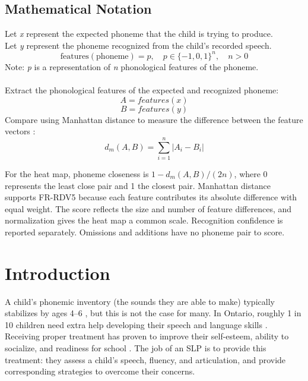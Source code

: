 \documentclass[12pt]{article}
\begin{document}
\subsection{Mathematical Notation} \label{sec:phoneme-notation}

Let \textit{x} represent the expected phoneme that the child is trying to produce.\\
Let \textit{y} represent the phoneme recognized from the child's recorded speech.\\
  \begin{equation}
    \mathrm{features}(\mathrm{phoneme}) = p,\quad p \in \{-1,0,1\}^n,\quad n>0
  \end{equation}
\noindent Note: \textit{p} is a representation of \textit{n} phonological features of the phoneme.\\ \\
\noindent Extract the phonological features of the expected and recognized phoneme:
\begin{equation}
  A = features(x)
\end{equation}
\begin{equation}
  B = features(y)
\end{equation}
\noindent Compare using Manhattan distance to measure the difference between the feature vectors \cite{manhattan_distance_sd}:
\begin{equation}
  d_m(A,B) = \sum_{i=1}^{n} |A_i - B_i|
\end{equation}

For the heat map, phoneme closeness is $1 - d_m(A,B)/(2n)$, where
0 represents the least close pair and 1 the closest pair. Manhattan distance
supports FR-RDV5 because each feature contributes its absolute difference
with equal weight. The score reflects the size and number of feature
differences, and normalization gives the heat map a common scale. Recognition
confidence is reported separately. Omissions and additions have no phoneme
pair to score.
\newpage


\section{Introduction} \label{sec:introduction}

A child’s phonemic inventory (the sounds they are able to make) typically stabilizes by ages 4--6 \cite{kid_sense_dev}, but this is not the case for many. In Ontario, roughly 1 in 10 children need extra help developing their speech and language skills \cite{ontario_slp_facts}. Receiving proper treatment has proven to improve their self-esteem, ability to socialize, and readiness for school \cite{ontario_slp_facts}. The job of an SLP is to provide this treatment: they assess a child’s speech, fluency, and articulation, and provide corresponding strategies to overcome their concerns.
\end{document}

